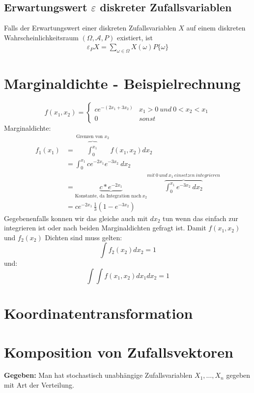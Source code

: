\documentclass{article}
\begin{document}
\subsection{Erwartungswert $\varepsilon$ diskreter Zufallsvariablen}
Falls der Erwartungswert einer diskreten Zufallsvariablen $X$ auf
einem diskreten Wahrscheinlichkeitsraum $(\Omega, \mathcal{A}, P)$ existiert,
ist
\begin{align}
	\varepsilon_P X = \sum_{\omega \in \Omega} X(\omega)P\{\omega\}
\end{align}

\section{Marginaldichte - Beispielrechnung}
\[	
	f(x_1,x_2)=
	\begin{cases}
		ce^{-(2x_1+3x_2)} & x_1  > 0 \: und \: 0 < x_2 <x_1 \\
		0 & sonst
	\end{cases}
\]
Marginaldichte:
\[
	\begin{split}
		f_1(x_1) 	& = \overbrace{\int_{0}^{x_1}}^{\text{Grenzen von }x_2} f(x_1,x_2) dx_2 \\
						   & = \int_{0}^{x_1} ce^{-2x_1}e^{-3x_2} \: dx_2 \\
						& = \underbrace{c*e^{-2x_1}}_{\text{Konstante, da Integration nach} \: x_2}
						\overbrace{\int_{0}^{x_1} e^{-3x_2} \: dx_2}^{mit \: 0 \: und \: x_1 \: einsetzen \: integrieren} \\
					 & = ce^{-2x_1}\, \frac{1}{3} (1-e^{-3x_2} )
	\end{split}
\]
Gegebenenfalls konnen wir das gleiche auch mit $dx_2$ tun wenn das einfach zur integrieren ist oder nach beiden Marginaldichten gefragt ist.
Damit $f(x_1,x_2)$ und $f_2(x_2)$ Dichten sind muss gelten:
\[
	\int f_2(x_2) dx_2 = 1
\]
und:
\[
	\int \int f(x_1,x_2) dx_1 dx_2 = 1
\]
\section{Koordinatentransformation}
\section{Komposition von Zufallsvektoren}
\begin{center}
\end{center}
\vspace*{7pt}
\textbf{Gegeben:} Man hat stochastisch unabhängige Zufallsvariablen $X_1, \ldots , X_n$ gegeben mit
Art der Verteilung.
\end{document}
